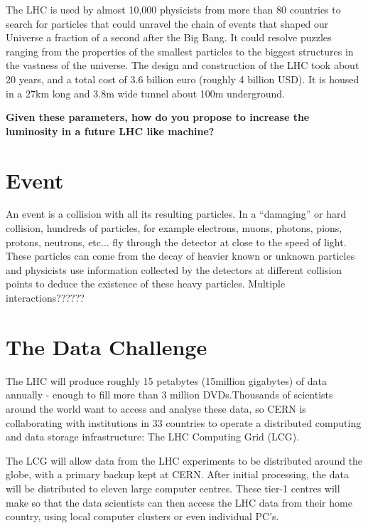 \;
\;

\noindent
The LHC is used by almost 10,000 physicists from more than 80 countries to search for particles that could unravel the chain of events that shaped our Universe a fraction of a second after the Big Bang. It could resolve puzzles ranging from the properties of the smallest particles to the biggest structures in the vastness of the universe. The design and construction of the LHC took about 20 years, and a total cost of 3.6 billion euro (roughly 4 billion USD). It is housed in a 27km long and 3.8m wide tunnel about 100m underground.

\;
\;

\noindent
\textbf{Given these parameters, how do you propose to increase the luminosity in a future LHC like machine?}

\;
\;

\section{Event}

\noindent
An event is a collision with all its resulting particles. In a ``damaging''  or hard collision, hundreds of particles, for example electrons, muons, photons, pions, protons, neutrons, etc... fly through the detector at close to the speed of light. These particles can come from the decay of heavier known or unknown particles and physicists use information collected by the detectors at different collision points to deduce the existence of these heavy particles. Multiple interactions??????

\;
\;

\section{The Data Challenge}

\noindent
The LHC will produce roughly 15 petabytes (15million gigabytes) of data annually - enough to fill more than 3 million DVDs.Thousands of scientists around the world want to access and analyse these data, so CERN is collaborating with institutions in 33 countries to operate a distributed computing and data storage infrastructure: The LHC Computing Grid (LCG).

\;
\;

\noindent
The LCG will allow data from the LHC experiments to be distributed around the globe, with a primary backup kept at CERN. After initial processing, the data will be distributed to eleven large computer centres. These tier-1 centres will make so that the data scientists can then access the LHC data from their home country, using local computer clusters or even individual PC's.


